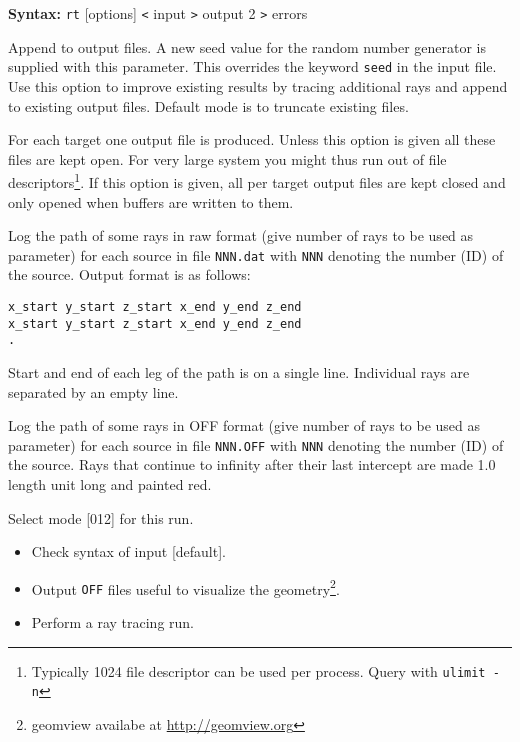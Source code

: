 \documentclass[10pt,a4paper,titlepage]{article}
\newcommand{\rt}{{\tt rt} }
\begin{document}
{\bf Syntax:} \rt [options] {\tt <} input {\tt >} output 2 {\tt >} errors
\vspace{1em}
\begin{list}{}
{\setlength{\leftmargin}{3.5cm}
\setlength{\labelwidth}{3.0cm}
\setlength{\labelsep}{0.25cm}
\setlength{\rightmargin}{0.5cm}}

\item[{\tt [--append|-a]}] Append to output files. A new seed value for the random number generator is supplied with this parameter. This overrides the keyword {\tt seed} in the input file. Use this option to improve existing results by tracing additional rays and append to existing output files. Default mode is to truncate existing files.

\item[{\tt [--keep\_closed|-k]}] For each target one output file is produced. Unless this option is given all these files are kept open. For very large system you might thus run out of file descriptors\footnote{Typically 1024 file descriptor can be used per process. Query with {\tt ulimit -n}}. If this option is given, all per target output files are kept closed and only opened when buffers are written to them.

\item[{\tt [--Log|-L]}] Log the path of some rays in raw format (give number of rays to be used as parameter) for each source in file {\tt NNN.dat} with {\tt NNN} denoting the number (ID) of the source. Output format is as follows:
\begin{verbatim}
x_start y_start z_start x_end y_end z_end
x_start y_start z_start x_end y_end z_end
.
\end{verbatim}
Start and end of each leg of the path is on a single line. Individual rays are separated by an empty line.  

\item[{\tt [--log|-l]}] Log the path of some rays in OFF format (give number of rays to be used as parameter) for each source in file {\tt NNN.OFF} with {\tt NNN} denoting the number (ID) of the source. Rays that continue to infinity after their last intercept are made 1.0 length unit long and painted red.

\item[{\tt [--mode|-m]}] Select mode [012] for this run.
\begin{itemize}
\item[\tt -m0]{Check syntax of input [default].}
\item[\tt -m1]{Output {\tt OFF} files useful to visualize the geometry\footnote{geomview availabe at \url{http://geomview.org}}.}
\item[\tt -m2]{Perform a ray tracing run.}
\end{itemize}


\end{list}
\end{document}

